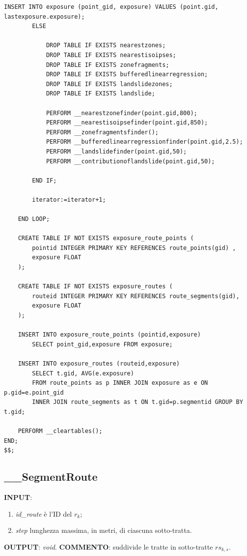 \begin{lstlisting}[style = mystyle]
			INSERT INTO exposure (point_gid, exposure) VALUES (point.gid, lastexposure.exposure);
		ELSE

			DROP TABLE IF EXISTS nearestzones;
			DROP TABLE IF EXISTS nearestisoipses;
			DROP TABLE IF EXISTS zonefragments;
			DROP TABLE IF EXISTS bufferedlinearregression;
			DROP TABLE IF EXISTS landslidezones;
			DROP TABLE IF EXISTS landslide;
	
			PERFORM __nearestzonefinder(point.gid,800);
			PERFORM __nearestisoipsefinder(point.gid,850);
			PERFORM __zonefragmentsfinder();
			PERFORM __bufferedlinearregressionfinder(point.gid,2.5);
			PERFORM __landslidefinder(point.gid,50);
			PERFORM __contributionoflandslide(point.gid,50);

		END IF;

		iterator:=iterator+1;

	END LOOP;

	CREATE TABLE IF NOT EXISTS exposure_route_points (
		pointid INTEGER PRIMARY KEY REFERENCES route_points(gid) ,
		exposure FLOAT
	);
	
	CREATE TABLE IF NOT EXISTS exposure_routes (
		routeid INTEGER PRIMARY KEY REFERENCES route_segments(gid),
		exposure FLOAT
	);

	INSERT INTO exposure_route_points (pointid,exposure) 
		SELECT point_gid,exposure FROM exposure;
	
	INSERT INTO exposure_routes (routeid,exposure) 
		SELECT t.gid, AVG(e.exposure) 
		FROM route_points as p INNER JOIN exposure as e ON p.gid=e.point_gid
		INNER JOIN route_segments as t ON t.gid=p.segmentid GROUP BY t.gid;

	PERFORM __cleartables();
END;
$$;

\end{lstlisting}

\subsection{\_\_SegmentRoute}

\textbf{INPUT}: 
\begin{enumerate}
	\item \textit{id\_route} è l'ID del $r_k$;
	\item \textit{step} lunghezza massima, in metri, di ciascuna sotto-tratta. 
\end{enumerate}
\textbf{OUTPUT}: \textit{void}. \newline
\textbf{COMMENTO}: suddivide le tratte in sotto-tratte $rs_{k,s}$.


